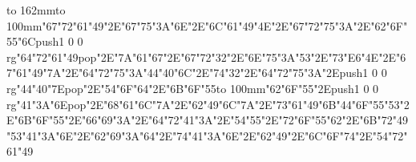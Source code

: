 \hbox to 162mm{\hsize=69mm\vbox to 100mm{\vfill\ipa\char"67\ipa\char"72\ipa\char"61\ipa\char"49\ipa\char"2E\ipa\char"67\ipa\char"75\ipa\char"3A\ipa\char"6E\ipa\char"2E\ipa\char"6C\ipa\char"61\ipa\char"49\ipa\char"4E\ipa\char"2E\ipa\char"67\ipa\char"72\ipa\char"75\ipa\char"3A\ipa\char"2E\ipa\char"62\ipa\char"6F\ipa\char"55\ipa\char"6C\medskip\pdfcolorstack\match push{1 0 0 rg}\ipa\char"64\ipa\char"72\ipa\char"61\ipa\char"49\pdfcolorstack\match pop{}\ipa\char"2E\ipa\char"7A\ipa\char"61\ipa\char"67\ipa\char"2E\ipa\char"67\ipa\char"72\ipa\char"32\ipa\char"2E\ipa\char"6E\ipa\char"75\ipa\char"3A\ipa\char"53\ipa\char"2E\ipa\char"73\ipa\char"E6\ipa\char"4E\ipa\char"2E\ipa\char"67\ipa\char"61\ipa\char"49\ipa\char"7A\ipa\char"2E\ipa\char"64\ipa\char"72\ipa\char"75\ipa\char"3A\medskip\ipa\char"44\ipa\char"40\ipa\char"6C\ipa\char"2E\ipa\char"74\ipa\char"32\ipa\char"2E\ipa\char"64\ipa\char"72\ipa\char"75\ipa\char"3A\ipa\char"2E\pdfcolorstack\match push{1 0 0 rg}\ipa\char"44\ipa\char"40\ipa\char"7E\pdfcolorstack\match pop{}\ipa\char"2E\ipa\char"54\ipa\char"6F\ipa\char"64\ipa\char"2E\ipa\char"6B\ipa\char"6F\ipa\char"55\vfill}\hfill\vbox to 100mm{\vfill\ipa\char"62\ipa\char"6F\ipa\char"55\ipa\char"2E\pdfcolorstack\match push{1 0 0 rg}\ipa\char"41\ipa\char"3A\ipa\char"6E\pdfcolorstack\match pop{}\ipa\char"2E\ipa\char"68\ipa\char"61\ipa\char"6C\ipa\char"7A\ipa\char"2E\ipa\char"62\ipa\char"49\ipa\char"6C\ipa\char"7A\ipa\char"2E\ipa\char"73\ipa\char"61\ipa\char"49\ipa\char"6B\medskip\ipa\char"44\ipa\char"6F\ipa\char"55\ipa\char"53\ipa\char"2E\ipa\char"6B\ipa\char"6F\ipa\char"55\ipa\char"2E\ipa\char"66\ipa\char"69\ipa\char"3A\ipa\char"2E\ipa\char"64\ipa\char"72\ipa\char"41\ipa\char"3A\ipa\char"2E\ipa\char"54\ipa\char"55\ipa\char"2E\ipa\char"72\ipa\char"6F\ipa\char"55\ipa\char"62\ipa\char"2E\ipa\char"6B\ipa\char"72\ipa\char"49\medskip\ipa\char"53\ipa\char"41\ipa\char"3A\ipa\char"6E\ipa\char"2E\ipa\char"62\ipa\char"69\ipa\char"3A\ipa\char"64\ipa\char"2E\ipa\char"74\ipa\char"41\ipa\char"3A\ipa\char"6E\ipa\char"2E\ipa\char"62\ipa\char"49\ipa\char"2E\ipa\char"6C\ipa\char"6F\ipa\char"74\ipa\char"2E\ipa\char"54\ipa\char"72\ipa\char"61\ipa\char"49\vfill}}\eject

